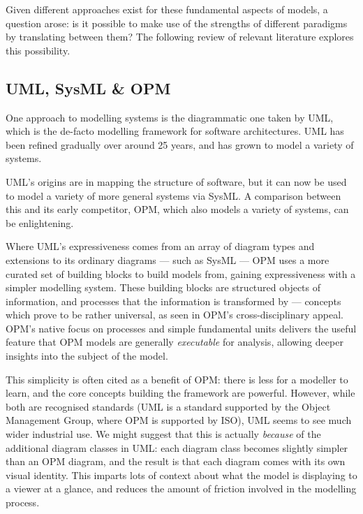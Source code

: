 \documentclass[draft]{article}
\begin{document}
Given different approaches exist for these fundamental aspects of models, a
question arose: is it possible to make use of the strengths of different
paradigms by translating between them? The following review of relevant
literature explores this possibility.\par


\subsection{UML, SysML \& OPM}
\label{subsec:uml}
One approach to modelling systems is the diagrammatic one taken by
UML\cite{rumbaugh2017unified}, which is the de-facto modelling framework for
software architectures. UML has been refined gradually over around 25 years, and
has grown to model a variety of systems.

UML's origins are in mapping the structure of software, but it can now be used
to model a variety of more general systems via SysML\cite{sysml_spec}. A
comparison between this and its early competitor, OPM\cite{dori1995object},
which also models a variety of systems, can be enlightening.\par

Where UML's expressiveness comes from an array of diagram types and extensions
to its ordinary diagrams --- such as SysML --- OPM uses a more curated set of
building blocks to build models from, gaining expressiveness with a simpler
modelling system. These building blocks are structured objects of information,
and processes that the information is transformed by --- concepts which prove to
be rather universal, as seen in OPM's cross-disciplinary
appeal\cite{opm_bio_research}. OPM's native focus on processes and simple
fundamental units delivers the useful feature that OPM models are generally
\emph{executable} for analysis, allowing deeper insights into the subject of
the model.\par

This simplicity is often cited as a benefit of OPM: there is less for a modeller
to learn, and the core concepts building the framework are powerful. However,
while both are recognised standards (UML is a standard supported by the Object
Management Group, where OPM is supported by ISO), UML seems to see much wider
industrial use. We might suggest that this is actually \emph{because} of the
additional diagram classes in UML: each diagram class becomes slightly simpler
than an OPM diagram, and the result is that each diagram comes with its own
visual identity. This imparts lots of context about what the model is displaying
to a viewer at a glance, and reduces the amount of friction involved in the
modelling process.\par
\end{document}
